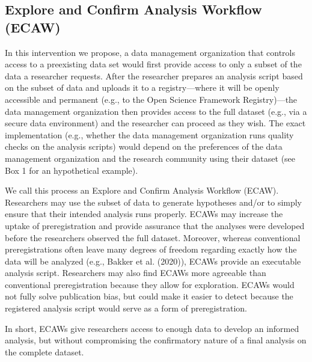 \documentclass[
  man,floatsintext]{apa6}
\begin{document}
\hypertarget{explore-and-confirm-analysis-workflow-ecaw}{%
\subsection{Explore and Confirm Analysis Workflow (ECAW)}\label{explore-and-confirm-analysis-workflow-ecaw}}

In this intervention we propose, a data management organization that controls access to a preexisting data set would first provide access to only a subset of the data a researcher requests. After the researcher prepares an analysis script based on the subset of data and uploads it to a registry---where it will be openly accessible and permanent (e.g., to the Open Science Framework Registry)---the data management organization then provides access to the full dataset (e.g., via a secure data environment) and the researcher can proceed as they wish. The exact implementation (e.g., whether the data management organization runs quality checks on the analysis scripts) would depend on the preferences of the data management organization and the research community using their dataset (see Box 1 for an hypothetical example).

We call this process an Explore and Confirm Analysis Workflow (ECAW). Researchers may use the subset of data to generate hypotheses and/or to simply ensure that their intended analysis runs properly. ECAWs may increase the uptake of preregistration and provide assurance that the analyses were developed before the researchers observed the full dataset. Moreover, whereas conventional preregistrations often leave many degrees of freedom regarding exactly how the data will be analyzed (e.g., Bakker et al. (2020)), ECAWs provide an executable analysis script. Researchers may also find ECAWs more agreeable than conventional preregistration because they allow for exploration. ECAWs would not fully solve publication bias, but could make it easier to detect because the registered analysis script would serve as a form of preregistration.

In short, ECAWs give researchers access to enough data to develop an informed analysis, but without compromising the confirmatory nature of a final analysis on the complete dataset.

\pagebreak
\end{document}
